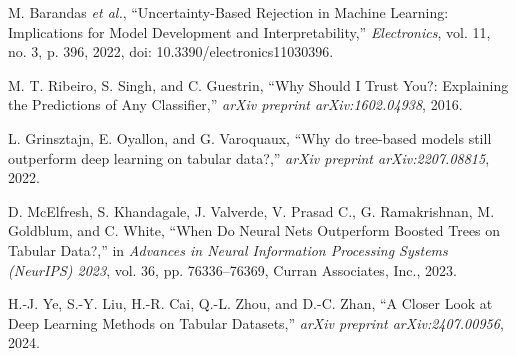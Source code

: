\documentclass{ieeeaccess}
\begin{document}
\begin{thebibliography}{1}
M. Barandas \emph{et al.}, ``Uncertainty-Based Rejection in Machine Learning: Implications for Model Development and Interpretability,'' \emph{Electronics}, vol. 11, no. 3, p. 396, 2022, doi: 10.3390/electronics11030396.

M. T. Ribeiro, S. Singh, and C. Guestrin, ``Why Should I Trust You?: Explaining the Predictions of Any Classifier,'' \emph{arXiv preprint arXiv:1602.04938}, 2016.

L. Grinsztajn, E. Oyallon, and G. Varoquaux, ``Why do tree-based models still outperform deep learning on tabular data?,'' \emph{arXiv preprint arXiv:2207.08815}, 2022.

D. McElfresh, S. Khandagale, J. Valverde, V. Prasad C., G. Ramakrishnan, M. Goldblum, and C. White, ``When Do Neural Nets Outperform Boosted Trees on Tabular Data?,'' in \emph{Advances in Neural Information Processing Systems (NeurIPS) 2023}, vol. 36, pp. 76336--76369, Curran Associates, Inc., 2023.

H.-J. Ye, S.-Y. Liu, H.-R. Cai, Q.-L. Zhou, and D.-C. Zhan, ``A Closer Look at Deep Learning Methods on Tabular Datasets,'' \emph{arXiv preprint arXiv:2407.00956}, 2024.


\end{thebibliography}


\EOD
\end{document}
